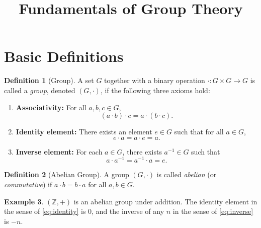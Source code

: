 \documentclass[12pt,a4paper]{article}
\title{\textbf{Fundamentals of Group Theory}}
\author{}
\date{}
\theoremstyle{definition}
\newtheorem{definition}{Definition}[section]
\newtheorem{example}[definition]{Example}
\theoremstyle{plain}
\theoremstyle{remark}
\newcommand{\Z}{\mathbb{Z}}
\begin{document}
\maketitle
\tableofcontents
\newpage

\section{Basic Definitions}\label{sec:basics}

\begin{definition}[Group]\label{def:group}
A set $G$ together with a binary operation $\cdot \colon G \times G \to G$ is called
a \emph{group}, denoted $(G, \cdot)$, if the following three axioms hold:
\begin{enumerate}
    \item \textbf{Associativity:} For all $a,b,c \in G$,
        \begin{equation}\label{eq:assoc}
            (a \cdot b) \cdot c = a \cdot (b \cdot c).
        \end{equation}
    \item \textbf{Identity element:} There exists an element $e \in G$ such that for all $a \in G$,
        \begin{equation}\label{eq:identity}
            e \cdot a = a \cdot e = a.
        \end{equation}
    \item \textbf{Inverse element:} For each $a \in G$, there exists $a^{-1} \in G$ such that
        \begin{equation}\label{eq:inverse}
            a \cdot a^{-1} = a^{-1} \cdot a = e.
        \end{equation}
\end{enumerate}
\end{definition}

\begin{definition}[Abelian Group]\label{def:abelian}
A group $(G, \cdot)$ is called \emph{abelian}
(or \emph{commutative}) if $a \cdot b = b \cdot a$ for all $a, b \in G$.
\end{definition}

\begin{example}\label{ex:integers}
$(\Z, +)$ is an abelian group under addition.
The identity element in the sense of \cref{eq:identity} is $0$,
and the inverse of any $n$ in the sense of \cref{eq:inverse} is $-n$.

\end{example}
\end{document}
